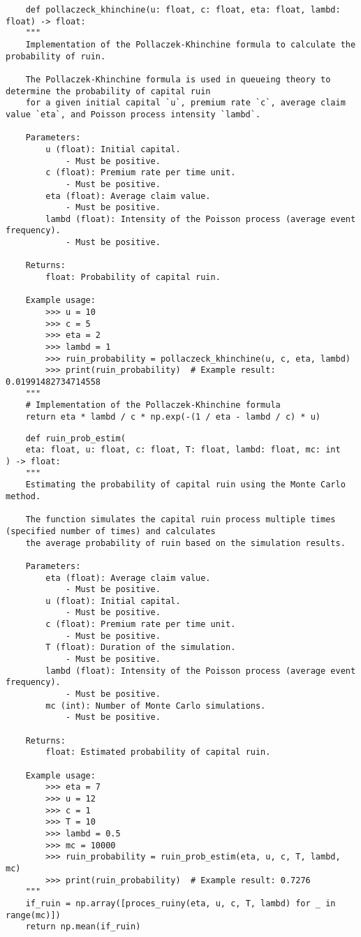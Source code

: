 \documentclass[12pt,letterpaper]{article}
\theoremstyle{definition}
\begin{document}
\begin{lstlisting}
    def pollaczeck_khinchine(u: float, c: float, eta: float, lambd: float) -> float:
    """
    Implementation of the Pollaczek-Khinchine formula to calculate the probability of ruin.

    The Pollaczek-Khinchine formula is used in queueing theory to determine the probability of capital ruin
    for a given initial capital `u`, premium rate `c`, average claim value `eta`, and Poisson process intensity `lambd`.

    Parameters:
        u (float): Initial capital.
            - Must be positive.
        c (float): Premium rate per time unit.
            - Must be positive.
        eta (float): Average claim value.
            - Must be positive.
        lambd (float): Intensity of the Poisson process (average event frequency).
            - Must be positive.

    Returns:
        float: Probability of capital ruin.

    Example usage:
        >>> u = 10
        >>> c = 5
        >>> eta = 2
        >>> lambd = 1
        >>> ruin_probability = pollaczeck_khinchine(u, c, eta, lambd)
        >>> print(ruin_probability)  # Example result: 0.01991482734714558
    """
    # Implementation of the Pollaczek-Khinchine formula
    return eta * lambd / c * np.exp(-(1 / eta - lambd / c) * u)

\end{lstlisting}

\begin{lstlisting}
    def ruin_prob_estim(
    eta: float, u: float, c: float, T: float, lambd: float, mc: int
) -> float:
    """
    Estimating the probability of capital ruin using the Monte Carlo method.

    The function simulates the capital ruin process multiple times (specified number of times) and calculates
    the average probability of ruin based on the simulation results.

    Parameters:
        eta (float): Average claim value.
            - Must be positive.
        u (float): Initial capital.
            - Must be positive.
        c (float): Premium rate per time unit.
            - Must be positive.
        T (float): Duration of the simulation.
            - Must be positive.
        lambd (float): Intensity of the Poisson process (average event frequency).
            - Must be positive.
        mc (int): Number of Monte Carlo simulations.
            - Must be positive.

    Returns:
        float: Estimated probability of capital ruin.

    Example usage:
        >>> eta = 7
        >>> u = 12
        >>> c = 1
        >>> T = 10
        >>> lambd = 0.5
        >>> mc = 10000
        >>> ruin_probability = ruin_prob_estim(eta, u, c, T, lambd, mc)
        >>> print(ruin_probability)  # Example result: 0.7276
    """
    if_ruin = np.array([proces_ruiny(eta, u, c, T, lambd) for _ in range(mc)])
    return np.mean(if_ruin)

\end{lstlisting}
\end{document}
